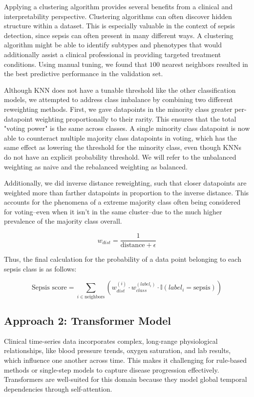 \documentclass{article}
\theoremstyle{plain}
\theoremstyle{definition}
\theoremstyle{remark}
\begin{document}
Applying a clustering algorithm provides several benefits from a clinical and interpretability perspective. Clustering algorithms can often discover hidden structure within a dataset. This is especially valuable in the context of sepsis detection, since sepsis can often present in many different ways. A clustering algorithm might be able to identify subtypes and phenotypes that would additionally assist a clinical professional in providing targeted treatment conditions. Using manual tuning, we found that $100$ nearest neighbors resulted in the best predictive performance in the validation set. 

Although KNN does not have a tunable threshold like the other classification models, we attempted to address class imbalance by combining two different reweighting methods. First, we gave datapoints in the minority class greater per-datapoint weighting proportionally to their rarity. This ensures that the total "voting power" is the same across classes. A single minority class datapoint is now able to counteract multiple majority class datapoints in voting, which has the same effect as lowering the threshold for the minority class, even though KNNs do not have an explicit probability threshold. We will refer to the unbalanced weighting as naive and the rebalanced weighting as balanced.

Additionally, we did inverse distance reweighting, such that closer datapoints are weighted more than farther datapoints in proportion to the inverse distance. This accounts for the phenomena of a extreme majority class often being considered for voting--even when it isn't in the same cluster--due to the much higher prevalence of the majority class overall.

\[w_{dist}=\frac{1}{\text{distance}+\epsilon}\]

Thus, the final calculation for the probability of a data point belonging to each sepsis class is as follows:

\[\text{Sepsis score} = \sum_{i \in \text{neighbors}} (w_{dist}^{(i)} \cdot w_{class}^{(label_i)} \cdot \mathbb{I}(label_i = \text{sepsis}))\]


\subsection{Approach 2: Transformer Model}

Clinical time-series data incorporates complex, long-range physiological relationships, like blood pressure trends, oxygen saturation, and lab results, which influence one another across time. This makes it challenging for rule-based methods or single-step models to capture disease progression effectively. Transformers are well-suited for this domain because they model global temporal dependencies through self-attention.
\end{document}
